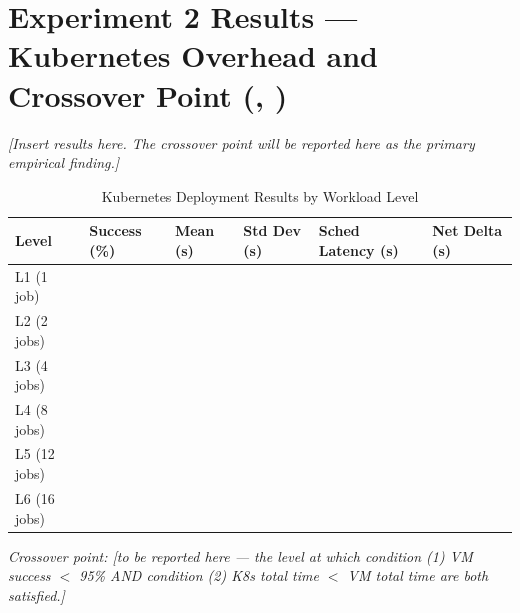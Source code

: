 \section{Experiment 2 Results --- Kubernetes Overhead and Crossover Point (, )}

\textit{[Insert results here. The crossover point will be reported here as the primary
empirical finding.]}

\begin{table}[H]
\centering
\caption{Kubernetes Deployment Results by Workload Level}
\label{tab:k8s_results}
\begin{tabularx}{\textwidth}{lXXXXX}
\toprule
\textbf{Level} & \textbf{Success (\%)} & \textbf{Mean (s)} & \textbf{Std Dev (s)} & \textbf{Sched Latency (s)} & \textbf{Net Delta (s)} \\
\midrule
L1 (1 job)  & & & & & \\
L2 (2 jobs) & & & & & \\
L3 (4 jobs) & & & & & \\
L4 (8 jobs) & & & & & \\
L5 (12 jobs)& & & & & \\
L6 (16 jobs)& & & & & \\
\bottomrule
\end{tabularx}
\end{table}

\textit{Crossover point: [to be reported here — the level at which condition (1) VM success
$<$ 95\% AND condition (2) K8s total time $<$ VM total time are both satisfied.]}
